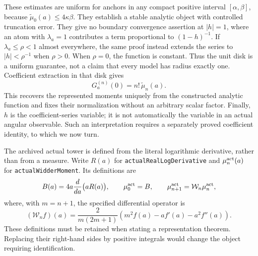 These estimates are uniform for anchors in any compact positive interval
$[\alpha,\beta]$, because $\widetilde\mu_0(a)\leq4\kappa\beta$.
They establish a stable analytic object with controlled truncation error.
They give no boundary convergence assertion at $|h|=1$, where an atom
with $\lambda_a=1$ contributes a term proportional to $(1-h)^{-1}$.
If $\lambda_a\leq\rho<1$ almost everywhere, the same proof instead
extends the series to $|h|<\rho^{-1}$ when $\rho>0$. When $\rho=0$,
the function is constant. Thus the unit disk is a uniform guarantee,
not a claim that every model has radius exactly one. Coefficient
extraction in that disk gives
\begin{equation}
 G_a^{(n)}(0)=n!\,\widetilde\mu_n(a).
\end{equation}
This recovers the represented moments uniquely from the constructed
analytic function and fixes their normalization without an arbitrary
scalar factor. Finally, $h$ is the coefficient-series
variable; it is not automatically the variable in an actual angular
observable. Such an interpretation requires a separately proved
coefficient identity, to which we now turn.

\label{front:actual-limit}

The archived actual tower is defined from the literal logarithmic
derivative, rather than from a measure. Write $R(a)$ for
\texttt{actualRealLogDerivative} and $\mu_n^{\rm act}(a)$ for
\texttt{actualWidderMoment}. Its definitions are
\begin{equation}
 B(a)=4a\frac{d}{da}\bigl(aR(a)\bigr),\qquad
 \mu_0^{\rm act}=B,\qquad
 \mu_{n+1}^{\rm act}=\mathcal W_n\mu_n^{\rm act},
\end{equation}
where, with $m=n+1$, the specified differential operator is
\begin{equation}
 (\mathcal W_nf)(a)=\frac{2}{m(2m+1)}
 \left(m^2f(a)-af'(a)-a^2f''(a)\right).
\end{equation}
These definitions must be retained when stating a representation theorem.
Replacing their right-hand sides by positive integrals would change the
object requiring identification.

